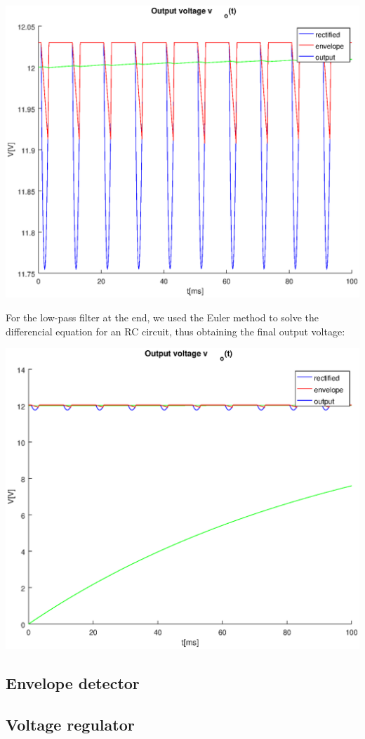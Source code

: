 \includegraphics[width=1\linewidth]{voutput.eps}

For the low-pass filter at the end, we used the Euler method to solve the differencial equation for an RC circuit, thus obtaining the final output voltage:

\includegraphics[width=1\linewidth]{voutput_init.eps}




\subsection{Envelope detector}

\subsection{Voltage regulator}

